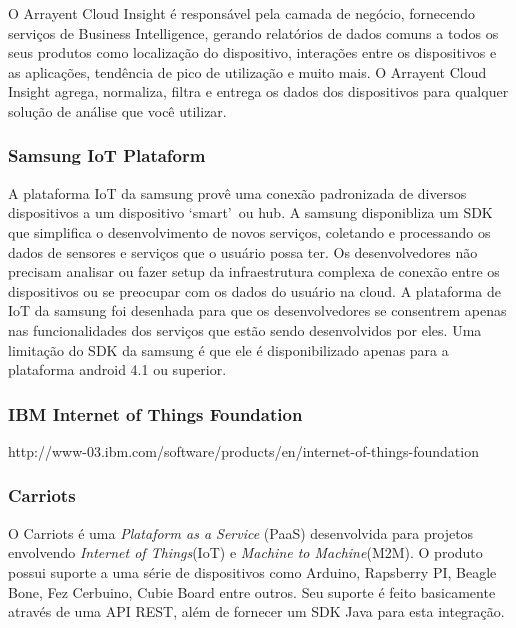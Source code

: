 O Arrayent Cloud Insight é responsável pela camada de negócio, fornecendo serviços de Business Intelligence,
gerando relatórios de dados comuns a todos os seus produtos como localização do dispositivo, interações entre
os dispositivos e as aplicações, tendência de pico de utilização e muito mais. O Arrayent Cloud Insight agrega,
normaliza, filtra e entrega os dados dos dispositivos para qualquer solução de análise que você utilizar.

\subsubsection{Samsung IoT Plataform}
A plataforma IoT da samsung provê uma conexão padronizada de diversos dispositivos a um dispositivo
\lq smart\rq\ ou hub. A samsung disponibliza um SDK que simplifica o desenvolvimento de novos serviços, coletando
e processando os dados de sensores e serviços que o usuário possa ter. Os desenvolvedores não precisam analisar ou
fazer setup da infraestrutura complexa de conexão entre os dispositivos ou se preocupar com os dados do usuário na cloud.
A plataforma de IoT da samsung foi desenhada para que os desenvolvedores se consentrem apenas nas funcionalidades
dos serviços que estão sendo desenvolvidos por eles. Uma limitação do SDK da samsung é que ele é disponibilizado
apenas para a plataforma android 4.1 ou superior.

\subsubsection{IBM Internet of Things Foundation}
http://www-03.ibm.com/software/products/en/internet-of-things-foundation

\subsubsection{Carriots}
O Carriots é uma \textit{Plataform as a Service} (PaaS) desenvolvida para projetos envolvendo
\textit{Internet of Things}(IoT) e \textit{Machine to Machine}(M2M). O produto possui suporte
a uma série de dispositivos como Arduino, Rapsberry PI, Beagle Bone, Fez Cerbuino, Cubie Board
entre outros. Seu suporte é feito basicamente através de uma API REST, além de fornecer um SDK
Java para esta integração.


